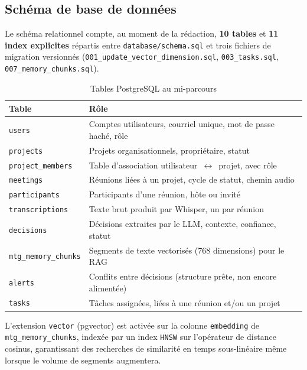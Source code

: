 \documentclass[12pt, a4paper]{article}
\begin{document}
\subsection{Schéma de base de données}

Le schéma relationnel compte, au moment de la rédaction, \textbf{10 tables} et \textbf{11 index explicites} répartis entre \texttt{database/schema.sql} et trois fichiers de migration versionnés (\texttt{001\_update\_vector\_dimension.sql}, \texttt{003\_tasks.sql}, \texttt{007\_memory\_chunks.sql}).

\begin{table}[H]
\centering
\caption{Tables PostgreSQL au mi-parcours}
\label{tab:tables}
\begin{tabularx}{\textwidth}{lX}
\toprule
\textbf{Table} & \textbf{Rôle} \\
\midrule
\texttt{users}              & Comptes utilisateurs, courriel unique, mot de passe haché, rôle \\
\texttt{projects}           & Projets organisationnels, propriétaire, statut \\
\texttt{project\_members}   & Table d'association utilisateur \,$\leftrightarrow$\, projet, avec rôle \\
\texttt{meetings}           & Réunions liées à un projet, cycle de statut, chemin audio \\
\texttt{participants}       & Participants d'une réunion, hôte ou invité \\
\texttt{transcriptions}     & Texte brut produit par Whisper, un par réunion \\
\texttt{decisions}          & Décisions extraites par le LLM, contexte, confiance, statut \\
\texttt{mtg\_memory\_chunks}& Segments de texte vectorisés (768 dimensions) pour le RAG \\
\texttt{alerts}             & Conflits entre décisions (structure prête, non encore alimentée) \\
\texttt{tasks}               & Tâches assignées, liées à une réunion et/ou un projet \\
\bottomrule
\end{tabularx}
\end{table}

L'extension \texttt{vector} (pgvector) est activée sur la colonne \texttt{embedding} de \texttt{mtg\_memory\_chunks}, indexée par un index \texttt{HNSW} sur l'opérateur de distance cosinus, garantissant des recherches de similarité en temps sous-linéaire même lorsque le volume de segments augmentera.
\end{document}
